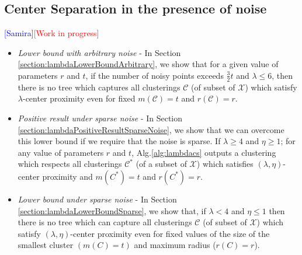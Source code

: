 \documentclass[anon,12pt]{colt2016} %
\newcommand{\mc}{\mathcal}
\newcommand{\wip}{\textcolor{red}{[Work in progress]}\xspace}
\newcommand{\samira}{\textcolor{blue}{[Samira]}\xspace}
\begin{document}
\subsection{Center Separation in the presence of noise}
\label{sec:cswith}
\samira\wip
%
%
%

\begin{itemize}
\item {\it Lower bound with arbitrary noise} - In Section \ref{section:lambdaLowerBoundArbitrary}, we show that for a given value of parameters $r$ and $t$, if the number of noisy points exceeds $\frac{3}{2}t$ and $\lambda \le 6$, then there is no tree which captures all clusterings $\mc C$ (of subset of $\mc X$) which satisfy $\lambda$-center proximity even for fixed $m(\mc C) = t$ and $r(\mc C) = r$.
\item  {\it Positive result under sparse noise} - In Section \ref{section:lambdaPositiveResultSparseNoise}, we show that we can overcome this lower bound if we require that the noise is sparse. If $\lambda \ge 4$ and $\eta \ge 1$; for any value of parameters $r$ and $t$, Alg.\ref{alg:lambdacs} outputs a clustering which respects all clusterings $\mc C^*$ (of a subset of $\mc X$) which satisfies $(\lambda, \eta)$-center proximity and $m(C^*)=t$ and $r(C^*) = r$.
\item  {\it Lower bound under sparse noise} - In Section \ref{section:lambdaLowerBoundSparse}, we show that, if $\lambda < 4$ and $\eta \le 1$ then there is no tree which can capture all clusterings $\mc C$ (of subset of $\mc X$) which satisfy $(\lambda, \eta)$-center proximity even for fixed values of the size of the smallest cluster $(m(C) = t)$ and maximum radius ($r(C) = r$).
\end{itemize} 

\end{document}

